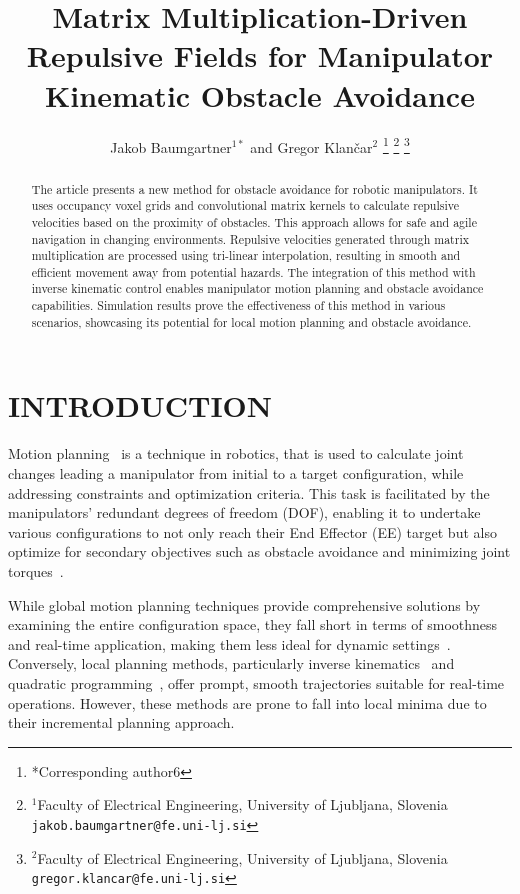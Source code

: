 \documentclass[letterpaper, 10 pt, conference]{ieeeconf}  %
\title{\LARGE \bf
Matrix Multiplication-Driven Repulsive Fields for Manipulator Kinematic Obstacle Avoidance
}
\author{
	Jakob Baumgartner$^{1 *}$ and Gregor Klančar$^{2}$%
\thanks{*Corresponding author6}%
\thanks{$^{1}$Faculty of Electrical Engineering, University of Ljubljana, Slovenia        
        {\tt\small jakob.baumgartner@fe.uni-lj.si}}%
\thanks{$^{2}$Faculty of Electrical Engineering, University of Ljubljana, Slovenia        
        {\tt\small gregor.klancar@fe.uni-lj.si}}%
}
\begin{document}
\maketitle
\thispagestyle{empty}
\pagestyle{empty}


\begin{abstract}

The article presents a new method for obstacle avoidance for robotic manipulators. It uses occupancy voxel grids and convolutional matrix kernels to calculate repulsive velocities based on the proximity of obstacles. This approach allows for safe and agile navigation in changing environments. Repulsive velocities generated through matrix multiplication are processed using tri-linear interpolation, resulting in smooth and efficient movement away from potential hazards. The integration of this method with inverse kinematic control enables manipulator motion planning and obstacle avoidance capabilities. Simulation results prove the effectiveness of this method in various scenarios, showcasing its potential for local motion planning and obstacle avoidance.

\end{abstract}

\section{INTRODUCTION}

Motion planning~\cite{c52} is a technique in robotics, that is used to calculate joint changes leading a manipulator from initial to a target configuration, while addressing constraints and optimization criteria. This task is facilitated by the manipulators' redundant degrees of freedom (DOF), enabling it to undertake various configurations to not only reach their End Effector (EE) target but also optimize for secondary objectives such as obstacle avoidance and minimizing joint torques~\cite{c30}.

While global motion planning techniques provide comprehensive solutions by examining the entire configuration space, they fall short in terms of smoothness and real-time application, making them less ideal for dynamic settings~\cite{c52}. Conversely, local planning methods, particularly inverse kinematics~\cite{c38} and quadratic programming~\cite{c21,c23, haviland2021neo}, offer prompt, smooth trajectories suitable for real-time operations. However, these methods are prone to fall into local minima due to their incremental planning approach.
\end{document}
